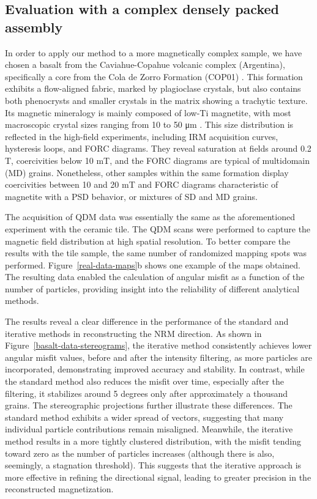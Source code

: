 \subsection{Evaluation with a complex densely packed assembly}

In order to apply our method to a more magnetically complex sample, we have chosen a basalt from the Caviahue-Copahue volcanic complex (Argentina), specifically a core from the Cola de Zorro Formation (COP01) \citep{Moncinhatto2019}. This formation exhibits a flow-aligned fabric, marked by plagioclase crystals, but also contains both phenocrysts and smaller crystals in the matrix showing a trachytic texture. Its magnetic mineralogy is mainly composed of low-Ti magnetite, with most macroscopic crystal sizes ranging from 10 to 50 \si{\micro\meter} \citep{Moncinhatto2019}. This size distribution is reflected in the high-field experiments, including IRM acquisition curves, hysteresis loops, and FORC diagrams. They reveal saturation at fields around 0.2 \si{T}, coercivities below 10 \si{mT}, and the FORC diagrams are typical of multidomain (MD) grains. Nonetheless, other samples within the same formation display coercivities between 10 and 20 \si{mT} and FORC diagrams characteristic of magnetite with a PSD behavior, or mixtures of SD and MD grains.

The acquisition of QDM data was essentially the same as the aforementioned experiment with the ceramic tile. The QDM scans were performed to capture the magnetic field distribution at high spatial resolution. To better compare the results with the tile sample, the same number of randomized mapping spots was performed. Figure~\ref{real-data-maps}b shows one example of the maps obtained. The resulting data enabled the calculation of angular misfit as a function of the number of particles, providing insight into the reliability of different analytical methods.

The results reveal a clear difference in the performance of the standard and iterative methods in reconstructing the NRM direction. As shown in Figure~\ref{basalt-data-stereograms}, the iterative method consistently achieves lower angular misfit values, before and after the intensity filtering, as more particles are incorporated, demonstrating improved accuracy and stability. In contrast, while the standard method also reduces the misfit over time, especially after the filtering, it stabilizes around 5 degrees only after approximately a thousand grains. The stereographic projections further illustrate these differences. The standard method exhibits a wider spread of vectors, suggesting that many individual particle contributions remain misaligned. Meanwhile, the iterative method results in a more tightly clustered distribution, with the misfit tending toward zero as the number of particles increases (although there is also, seemingly, a stagnation threshold). This suggests that the iterative approach is more effective in refining the directional signal, leading to greater precision in the reconstructed magnetization.

